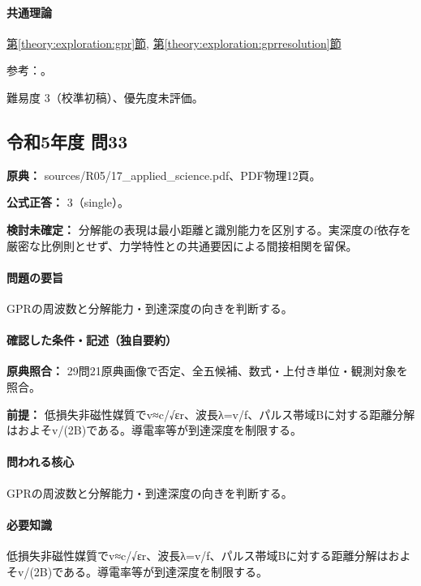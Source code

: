\paragraph{共通理論} \hyperref[theory:exploration:gpr]{第\ref*{theory:exploration:gpr}節}, \hyperref[theory:exploration:gprresolution]{第\ref*{theory:exploration:gprresolution}節}

\par 参考：\cite{epa_gpr}。

\par 難易度 3（校準初稿）、優先度未評価。

\subsection{令和5年度 問33}
\label{q:r05-reg-applied-33}

\noindent\textbf{原典：} sources/R05/17\_applied\_science.pdf、PDF物理12頁。

\textbf{公式正答：} 3（single）。

\par\textbf{検討未確定：} 分解能の表現は最小距離と識別能力を区別する。実深度のf依存を厳密な比例則とせず、力学特性との共通要因による間接相関を留保。

\paragraph{問題の要旨} GPRの周波数と分解能力・到達深度の向きを判断する。

\paragraph{確認した条件・記述（独自要約）}\mbox{}\par

\noindent\textbf{原典照合：} 29問21原典画像で否定、全五候補、数式・上付き単位・観測対象を照合。\par

\noindent\textbf{前提：} 低損失非磁性媒質でv≈c/√εr、波長λ=v/f、パルス帯域Bに対する距離分解はおよそv/(2B)である。導電率等が到達深度を制限する。\par

\paragraph{問われる核心} GPRの周波数と分解能力・到達深度の向きを判断する。

\paragraph{必要知識} 低損失非磁性媒質でv≈c/√εr、波長λ=v/f、パルス帯域Bに対する距離分解はおよそv/(2B)である。導電率等が到達深度を制限する。

